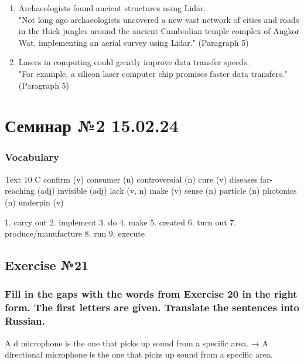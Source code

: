 \begin{enumerate}
      \item Archaeologists found ancient structures using Lidar. \\
            "Not long ago archaeologists uncovered a new vast network of cities and
            roads in the thick jungles around the ancient Cambodian temple complex
            of Angkor Wat, implementing an aerial survey using Lidar." (Paragraph 5)
      \item Lasers in computing could greatly improve data transfer speeds. \\
            "For example, a silicon laser computer chip promises faster data
            transfers." (Paragraph 5)
\end{enumerate}

\chapter{Семинар №2 15.02.24}

\subsection*{Vocabulary}

Text 10 C
confirm (v)
consumer (n)
controversial (n)
cure (v) diseases
far-reaching (adj)
invisible (adj)
lack (v, n)
make (v) sense (n)
particle (n)
photonics (n)
underpin (v)

1. carry out
2. implement
3. do
4. make
5. created
6. turn out
7. produce/manufacture
8. run
9. execute

\section*{Exercise №21}

\subsection*{Fill in the gaps with the words from Exercise 20 in the right form. The
      first letters are given. Translate the sentences into Russian.}
A d\underline{\hspace{2cm}} microphone is the one that picks up sound from a specific area.
→ A directional microphone is the one that picks up sound from a specific area.

